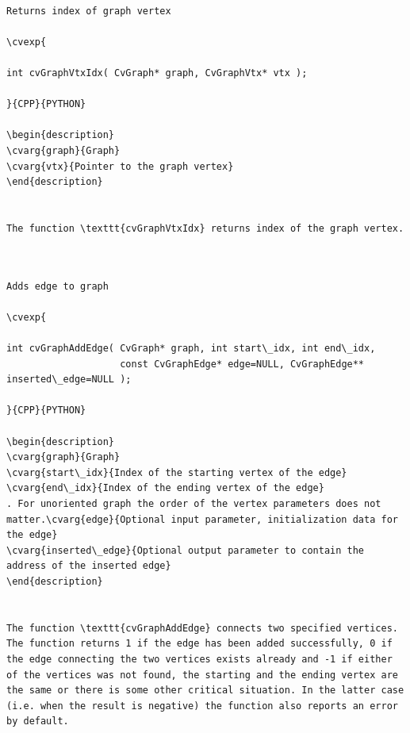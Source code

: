 \label{GraphVtxIdx}
\begin{verbatim}

Returns index of graph vertex

\cvexp{

int cvGraphVtxIdx( CvGraph* graph, CvGraphVtx* vtx );

}{CPP}{PYTHON}

\begin{description}
\cvarg{graph}{Graph}
\cvarg{vtx}{Pointer to the graph vertex}
\end{description}


The function \texttt{cvGraphVtxIdx} returns index of the graph vertex.


\end{verbatim}
\label{GraphAddEdge}
\begin{verbatim}

Adds edge to graph

\cvexp{

int cvGraphAddEdge( CvGraph* graph, int start\_idx, int end\_idx,
                    const CvGraphEdge* edge=NULL, CvGraphEdge** inserted\_edge=NULL );

}{CPP}{PYTHON}

\begin{description}
\cvarg{graph}{Graph}
\cvarg{start\_idx}{Index of the starting vertex of the edge}
\cvarg{end\_idx}{Index of the ending vertex of the edge}
. For unoriented graph the order of the vertex parameters does not matter.\cvarg{edge}{Optional input parameter, initialization data for the edge}
\cvarg{inserted\_edge}{Optional output parameter to contain the address of the inserted edge}
\end{description}


The function \texttt{cvGraphAddEdge} connects two specified vertices. The function returns 1 if the edge has been added successfully, 0 if the edge connecting the two vertices exists already and -1 if either of the vertices was not found, the starting and the ending vertex are the same or there is some other critical situation. In the latter case (i.e. when the result is negative) the function also reports an error by default.


\end{verbatim}
\label{GraphAddEdgeByPtr}
